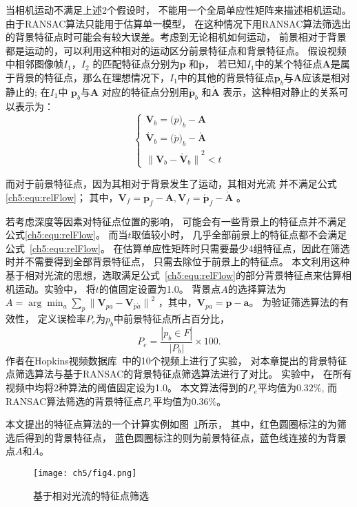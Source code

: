 当相机运动不满足上述2个假设时， 不能用一个全局单应性矩阵来描述相机运动。由于RANSAC算法只能用于估算单一模型， 在这种情况下用RANSAC算法筛选出的背景特征点时可能会有较大误差。考虑到无论相机如何运动， 前景相对于背景都是运动的，可以利用这种相对的运动区分前景特征点和背景特征点。 假设视频中相邻图像帧$I_1，I_2$ 的匹配特征点分别为$\mathbf{p}$ 和$\mathbf{\acute{p}}$， 若已知$I_1$中的某个特征点$\mathbf{A}$是属于背景的特征点，那么在理想情况下，$I_1$中的其他的背景特征点$\mathbf{p}_b$与$\mathbf{A}$应该是相对静止的; 在$I_1$中 $\mathbf{p}_b$与$\mathbf{A}$ 对应的特征点分别用$\mathbf{\acute{p}}_b$ 和$\mathbf{\acute{A}}$ 表示，这种相对静止的关系可以表示为：
\begin{equation}
\label{ch5:equ:relFlow}
\begin{cases}
  \mathbf{V}_b = \mathbf(p)_b - \mathbf{A}  \\
   \mathbf{\acute{V}}_b = \mathbf(\acute{p})_b - \mathbf{\acute{A}} \\
{\|\mathbf{V}_b-\mathbf{\acute{V}}_b\|}^2 < t
\end{cases}
\end{equation}
	 	
而对于前景特征点，因为其相对于背景发生了运动，其相对光流 并不满足公式\ref{ch5:equ:relFlow}； 其中，$ \mathbf{V}_f = \mathbf{p}_f - \mathbf{A},\mathbf{V}_f = \mathbf{\acute{p}}_f - \mathbf{\acute{A}}$  。\par
若考虑深度等因素对特征点位置的影响， 可能会有一些背景上的特征点并不满足公式\ref{ch5:equ:relFlow}。 而当$t$取值较小时， 几乎全部前景上的特征点都不会满足公式~\ref{ch5:equ:relFlow}。 在估算单应性矩阵时只需要最少4组特征点，因此在筛选时并不需要得到全部背景特征点， 只需去除位于前景上的特征点。 本文利用这种基于相对光流的思想，选取满足公式~\ref{ch5:equ:relFlow}的部分背景特征点来估算相机运动。实验中， 将$t$的值固定设置为1.0。 背景点$A$的选择算法为$A = \arg \min_{a}\sum_{p}{\|\mathbf{V}_{pa} - \mathbf{V}_{\acute{p}\acute{a}}\|}^2$ ，其中，$ \mathbf{V}_{pa} = \mathbf{p} - \mathbf{a}$。 为验证筛选算法的有效性， 定义误检率$P_e$为$p_b$中前景特征点所占百分比，$$P_e= \frac{|p_b \in F |}{|P_b|} \times 100. $$
作者在Hopkins视频数据库~\cite{HopKinsDataSet}中的10个视频上进行了实验， 对本章提出的背景特征点筛选算法与基于RANSAC的背景特征点筛选算法进行了对比。 实验中， 在所有视频中均将2种算法的阈值固定设为1.0。 本文算法得到的$P_e$平均值为$0.32 \%$, 而RANSAC算法筛选的背景特征点$P_e$平均值为$0.36\%$。 \par
本文提出的特征点算法的一个计算实例如图~\ref{ch5:fig:fpFilter}所示， 其中，红色圆圈标注的为筛选后得到的背景特征点， 蓝色圆圈标注的则为前景特征点，蓝色线连接的为背景点$A$和$\acute{A}$。\par
\begin{figure}[htb]
  \centering
  \texttt{[image: ch5/fig4.png]}
  \caption{基于相对光流的特征点筛选}\label{ch5:fig:fpFilter}
\end{figure}


